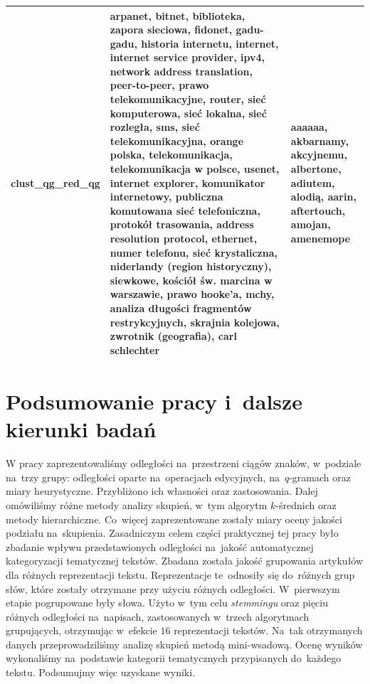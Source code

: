 \documentclass{praca1}
\begin{document}
\begin{table}[ht]
\begin{tabular}{lll}
clust\_qg\_red\_qg & arpanet, bitnet, biblioteka, zapora sieciowa, fidonet, gadu-gadu, historia internetu, internet, internet service provider, ipv4, network address translation, peer-to-peer, prawo telekomunikacyjne, router, sieć komputerowa, sieć lokalna, sieć rozległa, sms, sieć telekomunikacyjna, orange polska, telekomunikacja, telekomunikacja w polsce, usenet, internet explorer, komunikator internetowy, publiczna komutowana sieć telefoniczna, protokół trasowania, address resolution protocol, ethernet, numer telefonu, sieć krystaliczna, niderlandy (region historyczny), siewkowe, kościół św. marcina w warszawie, prawo hooke’a, mchy, analiza długości fragmentów restrykcyjnych, skrajnia kolejowa, zwrotnik (geografia), carl schlechter & aaaaaa, akbarnamy, akcyjnemu, albertone, adiutem, alodią, aarin, aftertouch, amojan, amenemope \\ 
   \hline
\end{tabular}
\end{table}

\chapter{Podsumowanie pracy i~dalsze kierunki badań}

W pracy zaprezentowaliśmy odległości na~przestrzeni ciągów znaków, w~podziale na~trzy grupy: odległości oparte na~operacjach edycyjnych, na~$q$-gramach oraz miary heurystyczne. Przybliżono ich własności oraz zastosowania. Dalej omówiliśmy różne metody analizy skupień, w~tym algorytm $k$-średnich oraz metody hierarchiczne. Co~więcej zaprezentowane zostały miary oceny jakości podziału na~skupienia. Zasadniczym celem części praktycznej tej pracy było zbadanie wpływu przedstawionych odległości na~jakość automatycznej kategoryzacji tematycznej tekstów. Zbadana została jakość grupowania artykułów dla różnych reprezentacji tekstu. Reprezentacje te~odnosiły się do~różnych grup słów, które zostały otrzymane przy użyciu różnych odległości. W~pierwszym etapie pogrupowane były słowa. Użyto w~tym celu \emph{stemmingu} oraz pięciu różnych odległości na~napisach, zastosowanych w~trzech algorytmach grupujących, otrzymując w~efekcie $16$ reprezentacji tekstów. Na~tak otrzymanych danych przeprowadziliśmy analizę skupień metodą mini-wsadową. Ocenę wyników wykonaliśmy na~podstawie kategorii tematycznych przypisanych do~każdego tekstu. Podsumujmy więc uzyskane wyniki.
\end{document}
